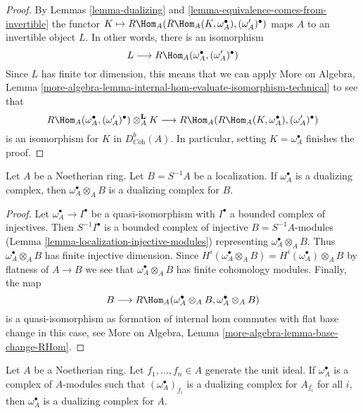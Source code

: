 \begin{proof}
By Lemmas \ref{lemma-dualizing} and
\ref{lemma-equivalence-comes-from-invertible} the functor
$K \mapsto R\Hom_A(R\Hom_A(K, \omega_A^\bullet), (\omega_A')^\bullet)$
maps $A$ to an invertible object $L$. In other words, there is
an isomorphism
$$
L \longrightarrow R\Hom_A(\omega_A^\bullet, (\omega_A')^\bullet)
$$
Since $L$ has finite tor dimension, this means that we can apply
More on Algebra, Lemma
\ref{more-algebra-lemma-internal-hom-evaluate-isomorphism-technical}
to see that
$$
R\Hom_A(\omega_A^\bullet, (\omega'_A)^\bullet) \otimes_A^\mathbf{L} K
\longrightarrow
R\Hom_A(R\Hom_A(K, \omega_A^\bullet), (\omega_A')^\bullet)
$$
is an isomorphism for $K$ in $D^b_{\textit{Coh}}(A)$.
In particular, setting $K = \omega_A^\bullet$ finishes the proof.
\end{proof}

\begin{lemma}
\label{lemma-dualizing-localize}
Let $A$ be a Noetherian ring. Let $B = S^{-1}A$ be a localization.
If $\omega_A^\bullet$ is a dualizing
complex, then $\omega_A^\bullet \otimes_A B$ is a dualizing
complex for $B$.
\end{lemma}

\begin{proof}
Let $\omega_A^\bullet \to I^\bullet$ be a quasi-isomorphism
with $I^\bullet$ a bounded complex of injectives.
Then $S^{-1}I^\bullet$ is a bounded complex of injective
$B = S^{-1}A$-modules (Lemma \ref{lemma-localization-injective-modules})
representing $\omega_A^\bullet \otimes_A B$.
Thus $\omega_A^\bullet \otimes_A B$ has finite injective dimension.
Since $H^i(\omega_A^\bullet \otimes_A B) = H^i(\omega_A^\bullet) \otimes_A B$
by flatness of $A \to B$ we see that $\omega_A^\bullet \otimes_A B$
has finite cohomology modules. Finally, the map
$$
B \longrightarrow
R\Hom_A(\omega_A^\bullet \otimes_A B, \omega_A^\bullet \otimes_A B)
$$
is a quasi-isomorphism as formation of internal hom commutes with
flat base change in this case, see
More on Algebra, Lemma \ref{more-algebra-lemma-base-change-RHom}.
\end{proof}

\begin{lemma}
\label{lemma-dualizing-glue}
Let $A$ be a Noetherian ring. Let $f_1, \ldots, f_n \in A$
generate the unit ideal. If $\omega_A^\bullet$ is a complex
of $A$-modules such that $(\omega_A^\bullet)_{f_i}$ is a dualizing
complex for $A_{f_i}$ for all $i$, then $\omega_A^\bullet$ is a dualizing
complex for $A$.
\end{lemma}

